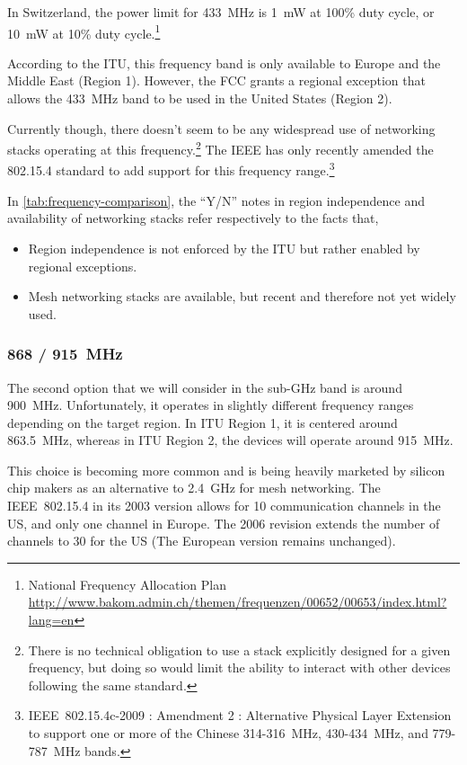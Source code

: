 In Switzerland, the power limit for \SI{433}{MHz} is \SI{1}{mW} at 100\% duty
cycle, or \SI{10}{mW} at 10\% duty cycle.\footnote{National Frequency Allocation Plan
\url{http://www.bakom.admin.ch/themen/frequenzen/00652/00653/index.html?lang=en}}

According to the ITU, this frequency band is only available to Europe and the
Middle East (Region 1). However, the FCC grants a regional exception that allows
the \SI{433}{MHz} band to be used in the United States (Region 2).

Currently though, there doesn't seem to be any widespread use of networking
stacks operating at this frequency.\footnote{There is no technical obligation to
use a stack explicitly designed for a given frequency, but doing so would limit
the ability to interact with other devices following the same standard.} The
IEEE has only recently amended the 802.15.4 standard to add support for this
frequency range.\footnote{IEEE~802.15.4c\texttrademark{}-2009 : Amendment 2 :
Alternative Physical Layer Extension to support one or more of the Chinese
314-316~MHz, 430-434~MHz, and 779-787~MHz bands.}

In \autoref{tab:frequency-comparison}, the ``Y/N'' notes in region independence
and availability of networking stacks refer respectively to the facts that,
\begin{itemize}
  \item Region independence is not enforced by the ITU but rather enabled by
    regional exceptions.
  \item Mesh networking stacks are available, but recent and therefore not yet
    widely used.
\end{itemize}

\subsubsection{868 / \SI{915}{MHz}}

The second option that we will consider in the sub-GHz band is around
\SI{900}{MHz}. Unfortunately, it operates in slightly different frequency ranges
depending on the target region. In \ac{ITU} Region 1, it is centered around
\SI{863.5}{MHz}, whereas in ITU Region 2, the devices will operate around
\SI{915}{MHz}.

This choice is becoming more common and is being heavily marketed by silicon
chip makers as an alternative to \SI{2.4}{GHz} for mesh networking. The
IEEE~802.15.4 in its 2003 version allows for 10 communication channels in the
US, and only one channel in Europe. The 2006 revision extends the number of
channels to 30 for the US (The European version remains unchanged).

